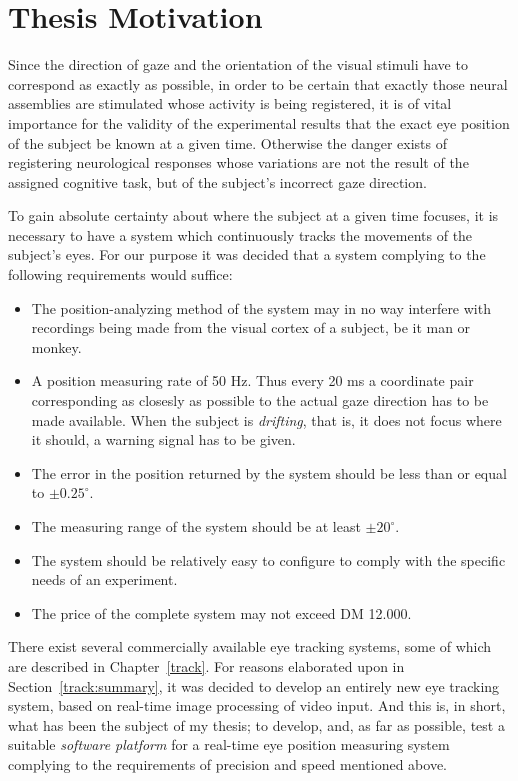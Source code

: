 \section{Thesis Motivation}
\label{intro:motivation}

Since the direction of gaze and the orientation of the visual stimuli
have to correspond as exactly as possible, in order to be certain that
exactly those neural assemblies are stimulated whose activity is being
registered, it is of vital importance for the validity of the
experimental results that the exact eye position of the subject be
known at a given time.  Otherwise the danger exists of registering
neurological responses whose variations are not the result of the
assigned cognitive task, but of the subject's incorrect gaze
direction.

To gain absolute certainty about where the subject at a given time
focuses, it is necessary to have a system which continuously tracks
the movements of the subject's eyes.  For our purpose it was decided
that a system complying to the following requirements would suffice:
\begin{itemize}
\item The position-analyzing method of the system may in no way
  interfere with recordings being made from the visual cortex of a
  subject, be it man or monkey.
\item A position measuring rate of 50 Hz.  Thus every 20 ms a
  coordinate pair corresponding as closesly as possible to the actual
  gaze direction has to be made available.  When the subject is {\em
    drifting\/}, that is, it does not focus where it should, a warning
  signal has to be given.
\item The error in the position returned by the system should be less
  than or equal to $\pm 0.25^{\circ}$.
\item The measuring range of the system should be at least $\pm
  20^{\circ}$.
\item The system should be relatively easy to configure to comply with
  the specific needs of an experiment.
\item The price of the complete system may not exceed DM 12.000.
\end{itemize}

There exist several commercially available eye tracking systems, some
of which are described in Chapter~\ref{track}.  For reasons elaborated
upon in Section~\ref{track:summary}, it was decided to develop an
entirely new eye tracking system, based on real-time image processing
of video input.  And this is, in short, what has been the subject of
my thesis; to develop, and, as far as possible, test a suitable {\em
  software platform\/} for a real-time eye position measuring system
complying to the requirements of precision and speed mentioned above.
